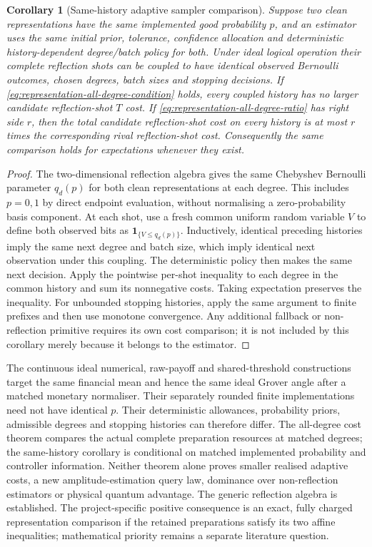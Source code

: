 \documentclass[11pt]{article}
\newtheorem{corollary}[theorem]{Corollary}
\begin{document}
\begin{corollary}[Same-history adaptive sampler comparison]
\label{cor:representation-same-history}
Suppose two clean representations have the same implemented good
probability $p$, and an estimator uses the same initial prior, tolerance,
confidence allocation and deterministic history-dependent degree/batch
policy for both. Under ideal logical operation their complete reflection
shots can be coupled to have identical observed Bernoulli outcomes,
chosen degrees, batch sizes and stopping decisions. If
\eqref{eq:representation-all-degree-condition} holds, every coupled
history has no larger candidate reflection-shot $T$ cost. If
\eqref{eq:representation-all-degree-ratio} has right side $r$, then
the total candidate reflection-shot cost on every history is at most
$r$ times the corresponding rival reflection-shot cost. Consequently
the same comparison holds for expectations whenever they exist.
\end{corollary}
\begin{proof}
The two-dimensional reflection algebra gives the same
Chebyshev Bernoulli parameter $q_d(p)$ for both clean representations
at each degree. This includes $p=0,1$ by direct endpoint evaluation,
without normalising a zero-probability basis component. At each shot,
use a fresh common uniform random variable $V$ to define both observed
bits as $\mathbf1_{\{V\leq q_d(p)\}}$. Inductively, identical preceding
histories imply the same next degree and batch size, which imply
identical next observation under this coupling. The deterministic
policy then makes the same next decision. Apply the pointwise
per-shot inequality to each degree in the common history and sum its
nonnegative costs. Taking expectation preserves the inequality.
For unbounded stopping histories, apply the same argument to finite
prefixes and then use monotone convergence. Any additional fallback
or non-reflection primitive requires its own cost comparison; it is not
included by this corollary merely because it belongs to the estimator.
\end{proof}

The continuous ideal numerical, raw-payoff and shared-threshold
constructions target the same financial mean and hence the same ideal
Grover angle after a matched monetary normaliser. Their separately
rounded finite implementations need not have identical $p$. Their
deterministic allowances, probability priors, admissible degrees and
stopping histories can therefore differ. The all-degree cost theorem
compares the actual complete preparation resources at matched degrees;
the same-history corollary is conditional on matched implemented
probability and controller information. Neither theorem alone proves
smaller realised adaptive costs, a new amplitude-estimation query law,
dominance over non-reflection estimators or physical quantum advantage.
The generic reflection algebra is established. The project-specific
positive consequence is an exact, fully charged representation
comparison if the retained preparations satisfy its two affine
inequalities; mathematical priority remains a separate literature
question.
\end{document}

